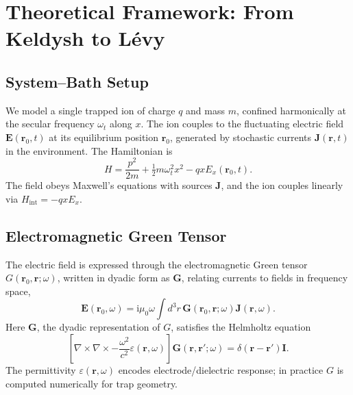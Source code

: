 \section{Theoretical Framework: From Keldysh to Lévy}
\label{sec:theory_foundations}

\subsection{System--Bath Setup}
We model a single trapped ion of charge $q$ and mass $m$, confined harmonically at the secular frequency $\omega_t$ along $x$.
The ion couples to the fluctuating electric field $\mathbf{E}(\mathbf{r}_0,t)$ at its equilibrium position $\mathbf{r}_0$, generated by stochastic currents $\mathbf{J}(\mathbf{r},t)$ in the environment.
The Hamiltonian is
\begin{equation}
H = \frac{p^2}{2m} + \tfrac{1}{2} m \omega_t^2 x^2 - q x E_x(\mathbf{r}_0,t).
\end{equation}
The field obeys Maxwell's equations with sources $\mathbf{J}$, and the ion couples linearly via $H_{\text{int}} = -q x E_x$.

\subsection{Electromagnetic Green Tensor}
The electric field is expressed through the electromagnetic Green tensor $G(\mathbf{r}_0,\mathbf{r};\omega)$, written in dyadic form as $\mathbf{G}$, relating currents to fields in frequency space,
\begin{equation}
\mathbf{E}(\mathbf{r}_0,\omega) = \mathrm{i}\mu_0 \omega \int d^3r\, \mathbf{G}(\mathbf{r}_0,\mathbf{r};\omega) \mathbf{J}(\mathbf{r},\omega).
\end{equation}
Here $\mathbf{G}$, the dyadic representation of $G$, satisfies the Helmholtz equation
\begin{equation}
\left[\nabla\times\nabla\times - \frac{\omega^2}{c^2}\varepsilon(\mathbf{r},\omega)\right]\mathbf{G}(\mathbf{r},\mathbf{r}';\omega) = \delta(\mathbf{r}-\mathbf{r}')\mathbf{I}.
\end{equation}
The permittivity $\varepsilon(\mathbf{r},\omega)$ encodes electrode/dielectric response; in practice $G$ is computed numerically for trap geometry.

